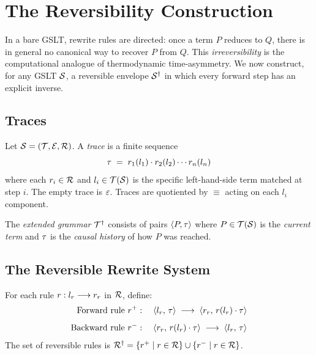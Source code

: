 \chapter{The Reversibility Construction}
\label{sec:reversibility}

In a bare GSLT, rewrite rules are directed: once a term $P$ reduces to $Q$,
there is in general no canonical way to recover $P$ from $Q$.  This
\emph{irreversibility} is the computational analogue of thermodynamic
time-asymmetry.  We now construct, for any GSLT $\mathcal{S}$, a reversible envelope
$\mathcal{S}^\dagger$ in which every forward step has an explicit inverse.

\section{Traces}

\begin{definition}[Trace]
Let $\mathcal{S} = (\mathcal{T}, \mathcal{E}, \mathcal{R})$.  A \emph{trace} is a finite sequence
\[
  \tau \;=\; r_1(l_1) \cdot r_2(l_2) \cdots r_n(l_n)
\]
where each $r_i \in \mathcal{R}$ and $l_i \in \mathcal{T}(\mathcal{S})$ is the specific
left-hand-side term matched at step $i$.  The empty trace is $\varepsilon$.
Traces are quotiented by $\equiv$ acting on each $l_i$ component.
\end{definition}

\begin{definition}
The \emph{extended grammar} $\mathcal{T}^\dagger$ consists of pairs $\langle P, \tau \rangle$
where $P \in \mathcal{T}(\mathcal{S})$ is the \emph{current term} and $\tau$ is the
\emph{causal history} of how $P$ was reached.
\end{definition}

\section{The Reversible Rewrite System}

\begin{definition}
For each rule $r : l_r \longrightarrow r_r$ in $\mathcal{R}$, define:
\begin{align}
  \text{Forward rule } r^+ &:\quad
    \langle l_r,\, \tau \rangle \;\longrightarrow\;
    \langle r_r,\, r(l_r) \cdot \tau \rangle \\[4pt]
  \text{Backward rule } r^- &:\quad
    \langle r_r,\, r(l_r) \cdot \tau \rangle \;\longrightarrow\;
    \langle l_r,\, \tau \rangle
\end{align}
The set of reversible rules is $\mathcal{R}^\dagger = \{r^+ \mid r \in \mathcal{R}\} \cup
\{r^- \mid r \in \mathcal{R}\}$.
\end{definition}

